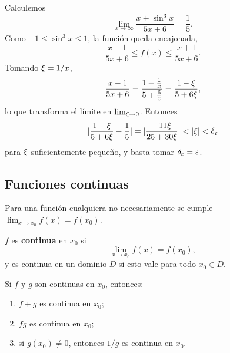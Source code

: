 \begin{ejemplo}
  \label{ej:limite_sandwich}
  Calculemos
  \begin{equation}
    \label{eq:limite_ejemplo}
    \lim_{x\rightarrow\infty}\frac{x+\sin^3x}{5x+6}=\frac{1}{5}.
  \end{equation}
  Como $-1\le\sin^3x\le 1$, la funci\'on queda encajonada,
  \begin{equation}
    \label{eq:sandwich}
    \frac{x-1}{5x+6}\le f(x)\le\frac{x+1}{5x+6}.
  \end{equation}
  Tomando $\xi=1/x$,
  \begin{equation}
    \label{eq:cambio_variable}
    \frac{x-1}{5x+6}
      =\frac{1-\frac{1}{x}}{5+\frac{6}{x}}
      =\frac{1-\xi}{5+6\xi},
  \end{equation}
  lo que transforma el l\'imite en $\lim_{\xi\rightarrow 0}$. Entonces
  \begin{equation}
    \label{eq:estimacion}
    \lvert \frac{1-\xi}{5+6\xi}-\frac{1}{5} \rvert
      =\lvert \frac{-11\xi}{25+30\xi} \rvert<\lvert \xi \rvert<\delta_\varepsilon
  \end{equation}
  para $\xi$ suficientemente peque\~no, y basta tomar $\delta_\varepsilon=\varepsilon$.
\end{ejemplo}

\subsection{Funciones continuas}
\label{subsec:continuidad_1d}

Para una funci\'on cualquiera no necesariamente se cumple
$\lim_{x\rightarrow x_0}f(x)=f(x_0)$.

\begin{definicion}[Continuidad]
  \label{def:continuidad_1d}
  $f$ es \textbf{continua} en $x_0$ si
  \begin{equation}
    \label{eq:continuidad_1d}
    \lim_{x\rightarrow x_0}f(x)=f(x_0),
  \end{equation}
  y es continua en un dominio $D$ si esto vale para todo $x_0\in D$.
\end{definicion}

\begin{teorema}
  \label{teo:algebra_continuas}
  Si $f$ y $g$ son continuas en $x_0$, entonces:
  \begin{enumerate}
    \item $f+g$ es continua en $x_0$;
    \item $fg$ es continua en $x_0$;
    \item si $g(x_0)\neq 0$, entonces $1/g$ es continua en $x_0$.
  \end{enumerate}
\end{teorema}

